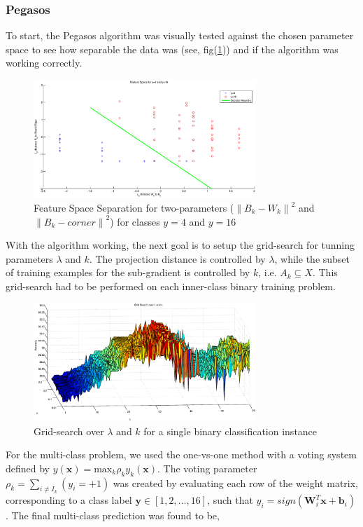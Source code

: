 \documentclass[fleqn]{article}
\begin{document}
\subsubsection{Pegasos}
\label{subsub:Pegasos}
To start, the Pegasos algorithm\cite{Shwartz:2007} was visually tested against the chosen parameter space to see how separable the data was (see, fig(\ref{fig:2D_Space})) and if the algorithm was working correctly.  
%
\begin{figure}[H]
	{\centering
		\includegraphics[trim = 10mm 8mm 10mm 0mm, clip,width=0.75\textwidth]{figs/2D_FeatureSpace}
		\caption{Feature Space Separation for two-parameters ($\left\|B_k - W_k\right\|^2$ and $\left\|B_k - corner\right\|^2$) for classes $y=4$ and $y=16$}
		\label{fig:2D_Space}
	}
\end{figure}
%
With the algorithm working, the next goal is to setup the grid-search for tunning parameters $\lambda$ and $k$.  The projection distance is controlled by $\lambda$, while the subset of training examples for the sub-gradient is controlled by $k$, i.e. $A_k \subseteq X$.  This grid-search had to be performed on each inner-class binary training problem. 
%
\begin{figure}[H]
	{\centering
		\includegraphics[trim = 10mm 8mm 10mm 0mm, clip,width=0.75\textwidth]{figs/Grid_Search}
		\caption{Grid-search over $\lambda$ and $k$ for a single binary classification instance}
		\label{fig:GridSearch}
	}
\end{figure}  
%
For the multi-class problem, we used the one-vs-one method with a voting system defined by $y(\mathbf{x}) = \text{max}_k \rho_k y_k (\mathbf{x})$.  The voting parameter $\rho_k = \sum_{i \neq I_k} (y_i = +1)$ was created by evaluating each row of the weight matrix, corresponding to a class label $\mathbf{y} \in [1,2,\dots,16]$, such that $y_i = sign(\mathbf{W}_i^T \mathbf{x} + \mathbf{b}_i)$.  The final multi-class prediction was found to be,
\end{document}
